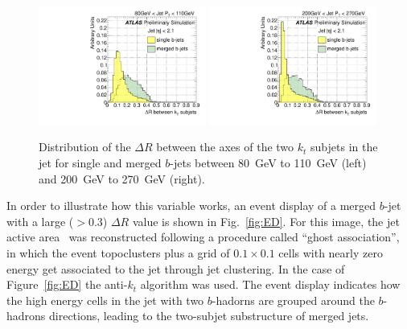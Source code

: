 \begin{figure}[tp]
\centering
\includegraphics[width=0.49\textwidth]{FIGS/VarsSingleMerged/DRkt2axes080.pdf}
\includegraphics[width=0.49\textwidth]{FIGS/VarsSingleMerged/DRkt2axes200.pdf}
\caption{Distribution of the $\Delta R$ between the axes of the two $k_t$ subjets in the jet for single and merged $b$-jets between 80~GeV to 110~GeV (left) and 200~GeV to 270~GeV (right).}
\label{fig:drktsinglemerged}
\end{figure}

In order to illustrate how this variable works, an event display of a merged $b$-jet with a large  ($>0.3$) $\Delta R$  %
value is shown in Fig.~\ref{fig:ED}.  For this image, the jet active area~\cite{CatchmentArea} was reconstructed following a procedure called ``ghost association'', in which the event topoclusters plus a grid of $0.1 \times 0.1$ cells  with nearly zero energy get associated to the jet through jet clustering. In the case of Figure~\ref{fig:ED} the anti-$k_t$ algorithm was used.  The event display indicates how the high energy cells in the jet with two $b$-hadorns are grouped around the $b$-hadrons directions, leading to the two-subjet substructure of merged jets.

